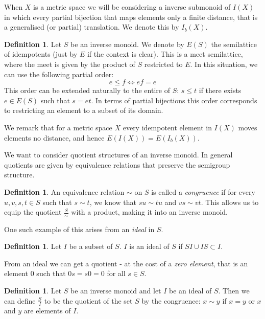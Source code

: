 \documentclass[11pt]{amsart}
\theoremstyle{plain}
\theoremstyle{definition}%
\newtheorem{definition}[theorem]{Definition}%
\theoremstyle{remark}%
\begin{document}
When $X$ is a metric space we will be considering a inverse submonoid of $I(X)$ in which every partial bijection that maps elements only a finite distance, that is a generalised (or partial) translation. We denote this by $I_{b}(X)$.

\begin{definition}
Let $S$ be an inverse monoid. We denote by $E(S)$ the semilattice of idempotents (just by $E$ if the context is clear). This is a meet semilattice, where the meet is given by the product of $S$ restricted to $E$. In this situation, we can use the following partial order:
\begin{equation*}
e \leq f \Leftrightarrow ef=e
\end{equation*}
This order can be extended naturally to the entire of $S$: $s \leq t$ if there exists $e \in E(S)$ such that $s=et$. In terms of partial bijections this order corresponds to restricting an element to a subset of its domain.
\end{definition}

We remark that for a metric space $X$ every idempotent element in $I(X)$ moves elements no distance, and hence $E(I(X))=E(I_{b}(X))$.

We want to consider quotient structures of an inverse monoid. In general quotients are given by equivalence relations that preserve the semigroup structure.

\begin{definition}
An equivalence relation $\sim$ on $S$ is called a \textit{congruence} if for every $u,v,s,t \in S$ such that $s \sim t$, we know that $su\sim tu$ and $vs \sim vt$. This allows us to equip the quotient $\frac{S}{\sim}$ with a product, making it into an inverse monoid.
\end{definition}

One such example of this arises from an \textit{ideal} in $S$.

\begin{definition}
Let $I$ be a subset of $S$. $I$ is an ideal of $S$ if $SI \cup IS \subset I$.
\end{definition}

From an ideal we can get a quotient - at the cost of a \textit{zero element}, that is an element $0$ such that $0s=s0=0$ for all $s \in S$.

\begin{definition}
Let $S$ be an inverse monoid and let $I$ be an ideal of $S$. Then we can define $\frac{S}{I}$ to be the quotient of the set $S$ by the congruence: $x \sim y$ if $x=y$ or $x$ and $y$ are elements of $I$. 
\end{definition}
\end{document}
